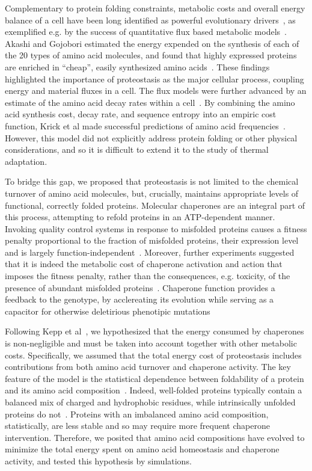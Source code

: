 \documentclass[10pt,letterpaper]{article}
\begin{document}
Complementary to protein folding constraints, metabolic costs and overall energy balance of a cell have been long identified as powerful evolutionary drivers~\cite{Pal2006An}, as exemplified e.g. by the success of quantitative flux based metabolic models~\cite{Varma1994Metabolic,Price2004Genome}. Akashi and Gojobori estimated the energy expended on the synthesis of each of the 20 types of amino acid molecules, and found that highly expressed proteins are enriched in ``cheap'', easily synthesized amino acids~\cite{Akashi2002Metabolic}. These findings highlighted the importance of proteostasis as the major cellular process, coupling energy and material fluxes in a cell. The flux models were further advanced by an estimate of the amino acid decay rates within a cell~\cite{Krick2014Amino}. By combining the amino acid synthesis cost, decay rate, and sequence entropy into an empiric cost function, Krick et al made successful predictions of amino acid frequencies~\cite{Krick2014Amino}. However, this model did not explicitly address protein folding or other physical considerations, and so it is difficult to extend it to the study of thermal adaptation.

To bridge this gap, we proposed that proteostasis is not limited to the chemical turnover of amino acid molecules, but, crucially, maintains appropriate levels of functional, correctly folded proteins. Molecular chaperones are an integral part of this process, attempting to refold proteins in an ATP-dependent manner. Invoking quality control systems in response to misfolded proteins causes a fitness penalty proportional to the fraction of misfolded proteins, their expression level and is largely function-independent~\cite{Samerotte2011Misfolded}. Moreover, further experiments suggested that it is indeed the metabolic cost of chaperone activation and action that imposes the fitness penalty, rather than the consequences, e.g. toxicity, of the presence of abundant misfolded proteins~\cite{Tomala2014Fitness}. Chaperone function provides a feedback to the genotype, by acclereating its evolution while serving as a capacitor for otherwise deletirious phenotipic mutations~\cite{Bogumil2012Cumulative,Cetinbas2013Catalysis}

Following Kepp et al~\cite{Kepp2014Model}, we hypothesized that the energy consumed by chaperones is non-negligible and must be taken into account together with other metabolic costs. Specifically, we assumed that the total energy cost of proteostasis includes contributions from both amino acid turnover and chaperone activity. The key feature of the model is the statistical dependence between foldability of a protein and its amino acid composition~\cite{Dill1985Theory,Berezovsky2007Positive,Venev2015Massively}. Indeed, well-folded proteins typically contain a balanced mix of charged and hydrophobic residues, while intrinsically unfolded proteins do not~\cite{Uversky2000Why}. Proteins with an imbalanced amino acid composition, statistically, are less stable and so may require more frequent chaperone intervention. Therefore, we posited that amino acid compositions have evolved to minimize the total energy spent on amino acid homeostasis and chaperone activity, and tested this hypothesis by simulations.
\end{document}
